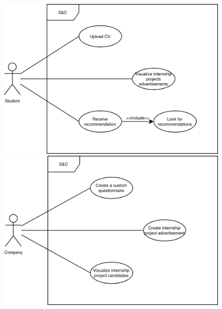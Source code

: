 \begin{figure}[H]
    \centering
    \begin{minipage}{0.3\textwidth}
        \centering
        \includegraphics[width=\linewidth]{../assets/use-case-diagrams/student-unique.png}
    \end{minipage}
    \hspace{1in}
    \begin{minipage}{0.3\textwidth}
        \centering
        \includegraphics[width=\linewidth]{../assets/use-case-diagrams/company-unique.png}
    \end{minipage}
\end{figure}

